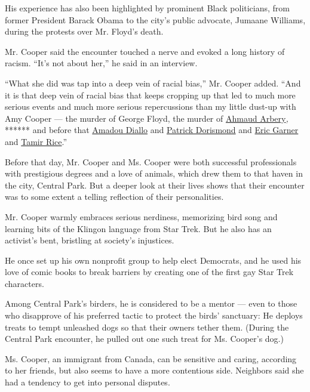 His experience has also been highlighted by prominent Black politicians,
from former President Barack Obama to the city's public advocate,
Jumaane Williams, during the protests over Mr. Floyd's death.

Mr. Cooper said the encounter touched a nerve and evoked a long history
of racism. ``It's not about her,'' he said in an interview.

``What she did was tap into a deep vein of racial bias,'' Mr. Cooper
added. ``And it is that deep vein of racial bias that keeps cropping up
that led to much more serious events and much more serious repercussions
than my little dust-up with Amy Cooper --- the murder of George Floyd,
the murder of
\href{https://www.nytimes3xbfgragh.onion/article/ahmaud-arbery-shooting-georgia.html}{Ahmaud
Arbery}\emph{,} ****** and before that
\href{https://www.nytimes3xbfgragh.onion/topic/person/amadou-diallo}{Amadou
Diallo} and
\href{https://www.nytimes3xbfgragh.onion/2000/03/17/nyregion/undercover-police-in-manhattan-kill-an-unarmed-man-in-a-scuffle.html}{Patrick
Dorismond} and
\href{https://www.nytimes3xbfgragh.onion/2015/06/14/nyregion/eric-garner-police-chokehold-staten-island.html}{Eric
Garner} and
\href{https://www.nytimes3xbfgragh.onion/2015/12/30/magazine/tamir-rice-and-the-color-of-fear.html}{Tamir
Rice}.''

Before that day, Mr. Cooper and Ms. Cooper were both successful
professionals with prestigious degrees and a love of animals, which drew
them to that haven in the city, Central Park. But a deeper look at their
lives shows that their encounter was to some extent a telling reflection
of their personalities.

Mr. Cooper warmly embraces serious nerdiness, memorizing bird song and
learning bits of the Klingon language from Star Trek. But he also has an
activist's bent, bristling at society's injustices.

He once set up his own nonprofit group to help elect Democrats, and he
used his love of comic books to break barriers by creating one of the
first gay Star Trek characters.

Among Central Park's birders, he is considered to be a mentor --- even
to those who disapprove of his preferred tactic to protect the birds'
sanctuary: He deploys treats to tempt unleashed dogs so that their
owners tether them. (During the Central Park encounter, he pulled out
one such treat for Ms. Cooper's dog.)

Ms. Cooper, an immigrant from Canada, can be sensitive and caring,
according to her friends, but also seems to have a more contentious
side. Neighbors said she had a tendency to get into personal disputes.

